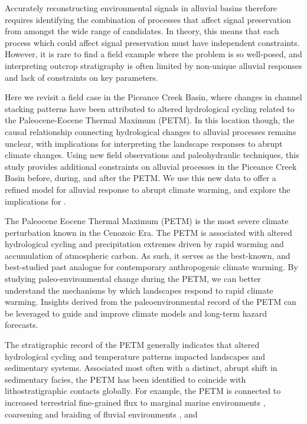 \documentclass[draft]{compact_proposal}
\begin{document}
Accurately reconstructing environmental signals in alluvial basins therefore requires identifying the combination of processes that affect signal preservation from amongst the wide range of candidates.
In theory, this means that each process which could affect signal preservation must have independent constraints.
However, it is rare to find a field example where the problem is so well-posed, and interpreting outcrop stratigraphy is often limited by non-unique alluvial responses and lack of constraints on key parameters.

Here we revisit a field case in the Piceance Creek Basin, where changes in channel stacking patterns have been attributed to altered hydrological cycling related to the Paleocene-Eocene Thermal Maximum (PETM).
In this location though, the causal relationship connecting hydrological changes to alluvial processes remains unclear, with implications for interpreting the landscape responses to abrupt climate changes.
Using new field observations and paleohydraulic techniques, this study provides additional constraints on alluvial processes in the Piceance Creek Basin before, during, and after the PETM.
We use this new data to offer a refined model for alluvial response to abrupt climate warming, and explore the implications for \pnote[something]. 


The Paleocene Eocene Thermal Maximum (PETM) is the most severe climate perturbation known in the Cenozoic Era.
The PETM is associated with altered hydrological cycling and precipitation extremes driven by rapid warming and accumulation of atmospheric carbon.
As such, it serves as the best-known, and best-studied past analogue for contemporary anthropogenic climate warming.
By studying paleo-environmental change during the PETM, we can better understand the mechanisms by which landscapes respond to rapid climate warming.
Insights derived from the paleoenvironmental record of the PETM can be leveraged to guide and improve climate models and long-term hazard forecasts.

The stratigraphic record of the PETM generally indicates that altered hydrological cycling and temperature patterns impacted landscapes and sedimentary systems.
Associated most often with a distinct, abrupt shift in sedimentary facies, the PETM has been identified to coincide with lithostratigraphic contacts globally.
For example, the PETM is connected to increased terrestrial fine-grained flux to marginal marine environments \cnote[miller], coarsening and braiding of fluvial environments \cnote[pujalte], and 
\end{document}
